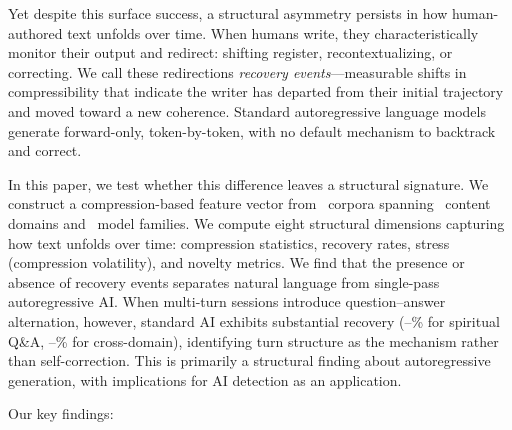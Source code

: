 \documentclass[11pt]{article}
\begin{document}
Yet despite this surface success, a structural asymmetry persists in how human-authored text unfolds over time. When humans write, they characteristically monitor their output and redirect: shifting register, recontextualizing, or correcting. We call these redirections \textit{recovery events}---measurable shifts in compressibility that indicate the writer has departed from their initial trajectory and moved toward a new coherence. Standard autoregressive language models generate forward-only, token-by-token, with no default mechanism to backtrack and correct.

In this paper, we test whether this difference leaves a structural signature. We construct a compression-based feature vector from \nCorpora\ corpora spanning \nDomains\ content domains and \nModels\ model families. We compute eight structural dimensions capturing how text unfolds over time: compression statistics, recovery rates, stress (compression volatility), and novelty metrics. We find that the presence or absence of recovery events separates natural language from single-pass autoregressive AI. When multi-turn sessions introduce question--answer alternation, however, standard AI exhibits substantial recovery (\recClaudeMT--\recGPTMT\% for spiritual Q\&A, \recMTXdomMin--\recMTXdomMax\% for cross-domain), identifying turn structure as the mechanism rather than self-correction. This is primarily a structural finding about autoregressive generation, with implications for AI detection as an application.

Our key findings:
\end{document}
